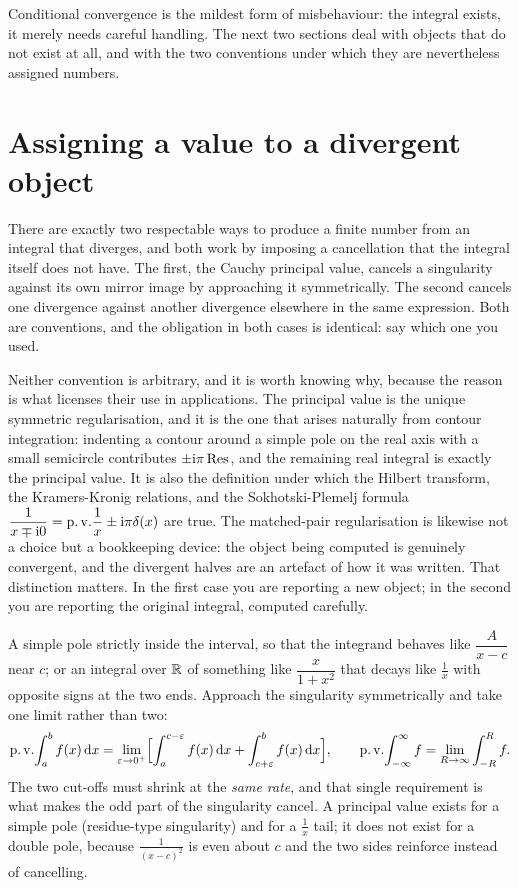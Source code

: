 Conditional convergence is the mildest form of misbehaviour: the integral exists, it merely needs careful handling. The next two sections deal with objects that do not exist at all, and with the two conventions under which they are nevertheless assigned numbers.

\section{Assigning a value to a divergent object}

There are exactly two respectable ways to produce a finite number from an integral that diverges, and both work by imposing a cancellation that the integral itself does not have. The first, the Cauchy principal value, cancels a singularity against its own mirror image by approaching it symmetrically. The second cancels one divergence against another divergence elsewhere in the same expression. Both are conventions, and the obligation in both cases is identical: say which one you used.

Neither convention is arbitrary, and it is worth knowing why, because the reason is what licenses their use in applications. The principal value is the unique symmetric regularisation, and it is the one that arises naturally from contour integration: indenting a contour around a simple pole on the real axis with a small semicircle contributes $\pm\mathrm{i}\pi\operatorname{Res}$, and the remaining real integral is exactly the principal value. It is also the definition under which the Hilbert transform, the Kramers-Kronig relations, and the Sokhotski-Plemelj formula $\dfrac{1}{x\mp\mathrm{i}0}=\operatorname{p.v.}\!\dfrac1x\pm\mathrm{i}\pi\delta(x)$ are true. The matched-pair regularisation is likewise not a choice but a bookkeeping device: the object being computed is genuinely convergent, and the divergent halves are an artefact of how it was written. That distinction matters. In the first case you are reporting a new object; in the second you are reporting the original integral, computed carefully.

\cue A simple pole strictly inside the interval, so that the integrand behaves like $\dfrac{A}{x-c}$ near $c$; or an integral over $\mathbb{R}$ of something like $\dfrac{x}{1+x^{2}}$ that decays like $\tfrac1x$ with opposite signs at the two ends.
\method Approach the singularity symmetrically and take one limit rather than two:
\[\operatorname{p.v.}\!\int_a^bf(x)\,\mathrm{d} x=\lim_{\varepsilon\to0^{+}}\Bigl[\int_a^{c-\varepsilon}f(x)\,\mathrm{d} x+\int_{c+\varepsilon}^{b}f(x)\,\mathrm{d} x\Bigr],\qquad \operatorname{p.v.}\!\int_{-\infty}^{\infty}f=\lim_{R\to\infty}\int_{-R}^{R}f.\]
The two cut-offs must shrink at the \emph{same rate}, and that single requirement is what makes the odd part of the singularity cancel. A principal value exists for a simple pole (residue-type singularity) and for a $\tfrac1x$ tail; it does not exist for a double pole, because $\tfrac{1}{(x-c)^{2}}$ is even about $c$ and the two sides reinforce instead of cancelling.

